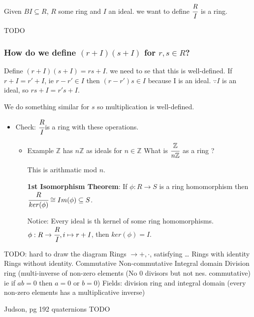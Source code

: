 \documentclass[11pt]{article}
\begin{document}
Given \(BI \subseteq R\), \(R\) some ring and \(I\) an ideal. we want to define \(\cfrac{R}{I}\) is a ring.

TODO


\subsubsection{How do we define \((r + I)(s + I)\) for \(r, s \in R\)?}
\label{sec:orgb211b2d}
Define \((r + I)(s + I) = rs + I\). we need to se that this is well-defined.
If \(r + I = r' + I\), ie \(r - r' \in I\) then \((r - r')s \in I\) because I is an ideal.
\(\because I\)  is an ideal, so \(rs + I = r's + I\).

We do something similar for \(s\) so  multiplication is well-defined.

\begin{itemize}
\item Check: $\cfrac{R}{I}$is a ring with these operations.
\begin{itemize}
\item Example \(\mathbb{Z}\) has \(n\mathbb{Z}\) as ideals for \(n \in \mathbb{Z}\)
What is \(\cfrac{\mathbb{Z}}{n\mathbb{Z}}\) as a ring ?

This is arithmatic mod \(n\).

\textbf{1st Isomorphism Theorem}: If \(\phi: R \to S\) is a ring homomorphism
then \(\cfrac{R}{ker(\phi)} \cong Im(\phi) \subseteq S\).

Notice: Every ideal is th kernel of some ring homomorphisms.
\(\phi: R \to \cfrac{R}{I}, i \mapsto r + I\), then \(ker(\phi) = I\).
\end{itemize}
\end{itemize}

TODO: hard to draw the diagram
Rings \(\to +, \cdot\), satisfying \ldots{}
Rings with identity                                   Rings without identity.
Commutative                         Non-commutative
Integral domain                              Division ring (multi-inverse of non-zero elements
(No 0 divisors                               but not nes. commutative)
ie if \(ab= 0\) then \(a = 0\) or \(b = 0\))
Fields: division ring and integral domain
(every non-zero elements has a multiplicative inverse)

Judson, pg 192 quaternions TODO
\end{document}
